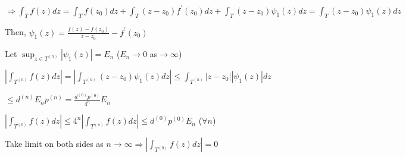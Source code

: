 \documentclass{article}
\begin{document}
\begin{flushleft}
$\Rightarrow \int_{T}^{} f(z) dz= \int_{T}^{} f(z_0) dz + \int_{T}^{} (z-z_0)f^{'}(z_0) dz + \int_{T}^{} (z-z_0)\psi_1(z) dz= \int_{T}^{} (z-z_0)\psi_1(z) dz$

Then, $\psi_1(z)= \frac{f(z)-f(z_0)}{z-z_0}-f^{'}(z_0)$

Let $\sup_{z\in T^{(n)}}|\psi_1(z)|= E_n$ ($E_n\rightarrow 0$ as$\rightarrow \infty$)

$|\int_{T^{(n)}}^{} f(z) dz|=|\int_{T^{(n)}}^{} (z-z_0)\psi_1(z) dz|\leq \int_{T^{(n)}}^{} |z-z_0||\psi_1(z)| dz$

$\leq d^{(n)}E_np^{(n)}=\frac{d^{(0)}p^{(0)}}{4^n}E_n$

$|\int_{T^{(0)}}^{} f(z) dz|\leq 4^n|\int_{T^{(n)}}^{} f(z) dz|\leq d^{(0)}p^{(0)}E_n$ ($\forall n$)

Take limit on both sides as $n\rightarrow \infty\Rightarrow |\int_{T^{(0)}}^{} f(z) dz|=0$ \\



\end{flushleft}
\end{document}
